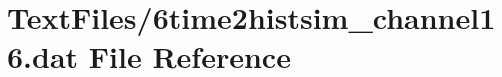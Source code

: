 \hypertarget{6time2histsim__channel16_8dat}{}\section{Text\+Files/6time2histsim\+\_\+channel16.dat File Reference}
\label{6time2histsim__channel16_8dat}
